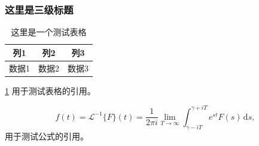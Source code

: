 \documentclass[\main/main.tex]{subfiles}
\begin{document}
\subsubsection{这里是三级标题}

\begin{table}[htb!]
  \centering
  \begin{tabular}{ccc}
    \toprule
    列1 & 列2 & 列3 \\
    \midrule
    数据1 & 数据2 & 数据3 \\
    \bottomrule
  \end{tabular}
  \caption{这里是一个测试表格}
  \label{这里是一个测试表格}
\end{table}
\cref{这里是一个测试表格} 用于测试表格的引用。

\zhlipsum[3]
\begin{equation}\label{eq:example}
  f(t)={\mathcal {L}}^{-1}\{F\}(t)={\frac {1}{2\pi i}}\lim _{T\to \infty }\int _{\gamma -iT}^{\gamma +iT}e^{st}F(s)\,\mathrm {d} s,
\end{equation}
 用于测试公式的引用。
\end{document}
